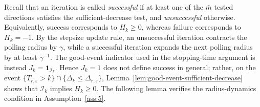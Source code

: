 \documentclass[11pt,a4paper]{article}
\newtheorem{lemma}{Lemma}[section]
\newcommand{\goldelta}{r}
\begin{document}
Recall that an iteration is called \emph{successful} if at least one of
the \(\bar{m}\) tested directions satisfies the sufficient-decrease test, and
\emph{unsuccessful} otherwise. Equivalently, success corresponds to
\(H_k\ge 0\), whereas failure corresponds to \(H_k=-1\). By the stepsize
update rule, an unsuccessful iteration contracts the polling radius by
\(\gamma\), while a successful iteration expands the next polling radius by at
least \(\gamma^{-1}\). The good-event indicator used in the stopping-time argument is instead
\(J_k=\mathbf 1_{\mathcal I_k}\). Hence \(J_k=1\) does not define success in
general; rather, on the event
\(\{T_{r,\varepsilon}>k\}\cap\{\Delta_k\le\Delta_{r,\varepsilon}\}\),
Lemma~\ref{lem:good-event-sufficient-decrease} shows that
\(\mathcal I_k\) implies \(H_k\ge0\). The following lemma verifies the radius-dynamics condition in
Assumption~\ref{ass:5}.
\end{document}
